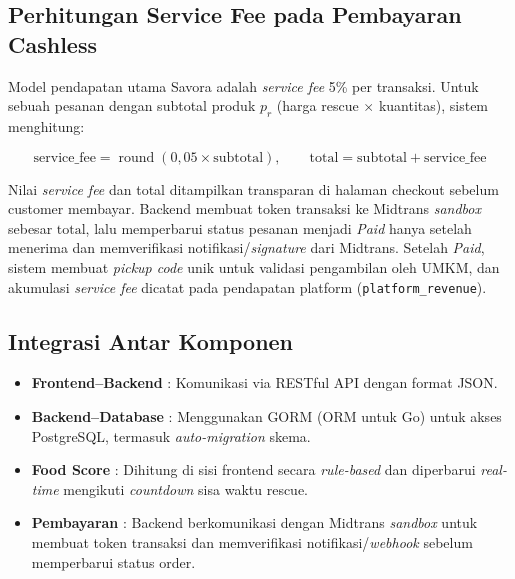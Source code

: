 \subsection{Perhitungan Service Fee pada Pembayaran Cashless}

Model pendapatan utama Savora adalah \textit{service fee} 5\% per transaksi. Untuk sebuah pesanan
dengan subtotal produk $p_{r}$ (harga rescue $\times$ kuantitas), sistem menghitung:

\begin{equation}
\mathrm{service\_fee} = \operatorname{round}(0{,}05 \times \mathrm{subtotal}), \qquad
\mathrm{total} = \mathrm{subtotal} + \mathrm{service\_fee}
\end{equation}

Nilai \textit{service fee} dan total ditampilkan transparan di halaman checkout sebelum customer
membayar. Backend membuat token transaksi ke Midtrans \textit{sandbox} sebesar $\mathrm{total}$,
lalu memperbarui status pesanan menjadi \emph{Paid} hanya setelah menerima dan memverifikasi
notifikasi/\textit{signature} dari Midtrans. Setelah \emph{Paid}, sistem membuat \textit{pickup
code} unik untuk validasi pengambilan oleh UMKM, dan akumulasi \textit{service fee} dicatat pada
pendapatan platform (\texttt{platform\_revenue}).

\subsection{Integrasi Antar Komponen}
\begin{itemize}[leftmargin=*]
    \item \textbf{Frontend--Backend} : Komunikasi via RESTful API dengan format JSON.
    \item \textbf{Backend--Database} : Menggunakan GORM (ORM untuk Go) untuk akses PostgreSQL, termasuk \textit{auto-migration} skema.
    \item \textbf{Food Score} : Dihitung di sisi frontend secara \textit{rule-based} dan diperbarui \textit{real-time} mengikuti \textit{countdown} sisa waktu rescue.
    \item \textbf{Pembayaran} : Backend berkomunikasi dengan Midtrans \textit{sandbox} untuk membuat token transaksi dan memverifikasi notifikasi/\textit{webhook} sebelum memperbarui status order.
\end{itemize}
